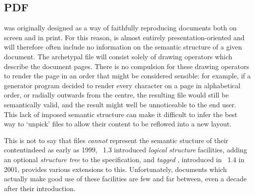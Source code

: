 \subsection{PDF}
\pdf{} was originally designed as a way of faithfully reproducing documents both on screen and in
print. For this reason, \pdf{} is almost entirely pre\-s\-en\-ta\-tion-oriented and will therefore
often include no information on the semantic structure of a given document. The archetypal \pdf{}
file will consist solely of drawing operators which describe the document pages. There is no
compulsion for these drawing operators to render the page in an order that might be considered
sensible: for example, if a \pdf{} generator program decided to render every character on a page in
alphabetical order, or radially outwards from the centre, the resulting file would still be
semantically valid, and the result might well be unnoticeable to the end user. This lack of imposed
semantic structure can make it difficult to infer the best way to `unpick' \pdf{} files to allow
their content to be reflowed into a new layout.

This is not to say that \pdf{} files \emph{cannot} represent the semantic stucture of their
content\ed indeed as early as 1999, \pdf{}~1.3 introduced \emph{logical structure}
facilities\cite{Adobe2001}, adding an optional \emph{structure tree} to the \pdf{} specification,
and \emph{tagged \pdf{}}, introduced in \pdf{}~1.4 in 2001, provides various extensions to this.
Unfortunately, \pdf{} documents which actually make good use of these facilities are few and far
between, even a decade after their introduction.


